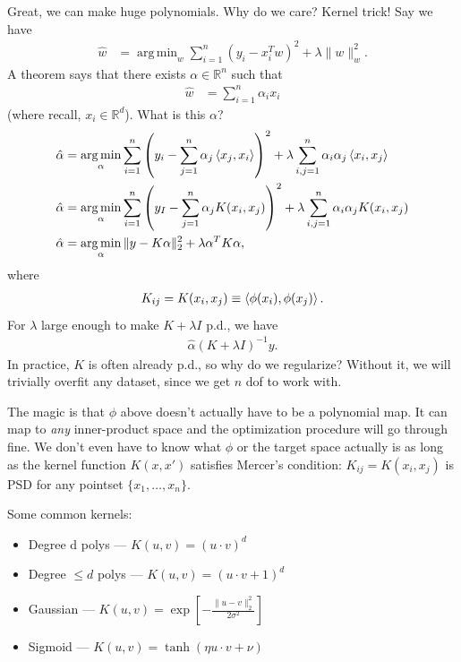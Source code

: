 \documentclass[11pt,letterpaper]{article}
\DeclareMathOperator*{\argmin}{arg\,min}
\theoremstyle{definition}
\numberwithin{equation}{section}
\numberwithin{figure}{section}
\begin{document}
Great, we can make huge polynomials. Why do we care? Kernel trick! Say we have
%
\begin{align}
	\hat{w} &= \argmin_{w} \sum_{i=1}^n \left(y_i - x_i^T w\right)^2 + \lambda \|w\|_w^2.
\end{align}
%
A theorem says that there exists $\alpha \in \mathbb{R}^n$ such that
%
\begin{align}
	\hat{w} &= \sum_{i=1}^n \alpha_i x_i
\end{align}
%
(where recall, $x_i \in \mathbb{R}^d$). What is this $\alpha$?
%
\begin{align}
	\hat{\alpha} &= \argmin_{\alpha} \sum_{i=1}^n \left(y_i - \sum_{j=1}^n \alpha_j \braket{x_j,x_i}\right)^2 + \lambda \sum_{i,j=1}^n \alpha_i \alpha_j \braket{x_i,x_j}\\
	\hat{\alpha} &= \argmin_{\alpha} \sum_{i=1}^n \left(y_I - \sum_{j=1}^n \alpha_j K(x_i,x_j)\right)^2 + \lambda \sum_{i,j=1}^n \alpha_i \alpha_j K(x_i,x_j)\\
	\hat{\alpha} &= \argmin_\alpha \|y - K\alpha\|_2^2 + \lambda \alpha^T K \alpha,
\end{align}
%
where
%
\begin{align}
	K_{ij} = K(x_i,x_j) \equiv \braket{\phi(x_i),\phi(x_j)}.
\end{align}
%
For $\lambda$ large enough to make $K+\lambda I$ p.d., we have
%
\begin{align}
	\hat{\alpha} (K+\lambda I)^{-1} y.
\end{align}
%
In practice, $K$ is often already p.d., so why do we regularize? Without it, we will trivially overfit any dataset, since we get $n$ dof to work with.

The magic is that $\phi$ above doesn't actually have to be a polynomial map. It can map to \emph{any} inner-product space and the optimization procedure will go through fine. We don't even have to know what $\phi$ or the target space actually is as long as the kernel function $K(x,x')$ satisfies Mercer's condition: $K_{ij} = K(x_i,x_j)$ is PSD for any pointset $\{x_1,\ldots,x_n\}$.


Some common kernels:
%
\begin{itemize}
	\item Degree d polys --- $K(u,v) = (u \cdot v)^d$
	\item Degree $\leq d$ polys --- $K(u,v) = (u\cdot v + 1)^d$
	\item Gaussian --- $K(u,v) = \exp\left[-\frac{\|u-v\|_2^2}{2\sigma^2}\right]$
	\item Sigmoid --- $K(u,v) = \tanh(\eta u\cdot v + \nu)$
\end{itemize}
\end{document}
